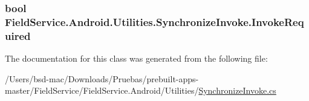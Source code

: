 \hypertarget{class_field_service_1_1_android_1_1_utilities_1_1_synchronize_invoke_afb4df6b060fa656a49632baf90eae27b}{
\subsubsection[{Invoke\+Required}]{\setlength{\rightskip}{0pt plus 5cm}bool Field\+Service.\+Android.\+Utilities.\+Synchronize\+Invoke.\+Invoke\+Required\hspace{0.3cm}{\ttfamily [get]}}}\label{class_field_service_1_1_android_1_1_utilities_1_1_synchronize_invoke_afb4df6b060fa656a49632baf90eae27b}


The documentation for this class was generated from the following file\+:\begin{DoxyCompactItemize}
\item 
/\+Users/bsd-\/mac/\+Downloads/\+Pruebas/prebuilt-\/apps-\/master/\+Field\+Service/\+Field\+Service.\+Android/\+Utilities/\hyperlink{_field_service_8_android_2_utilities_2_synchronize_invoke_8cs}{Synchronize\+Invoke.\+cs}\end{DoxyCompactItemize}
